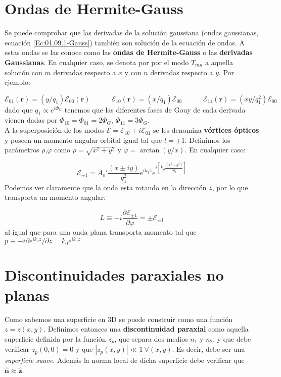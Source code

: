 \documentclass[12pt,a4paper]{book}
\numberwithin{equation}{section}
\numberwithin{figure}{section}
\newcommand{\tquad}{\quad \quad \quad}
\newcommand{\parentesis}[1]{\left( #1  \right)}
\newcommand{\parciales}[2]{\frac{\partial #1}{\partial #2}}
\newcommand{\ccorchetes}[1]{\left[ #1  \right]}
\newcommand{\1}{_{(1)}}
\newcommand{\2}{_{(2)}}
\newcommand{\zn}{\mathbf{z}}
\newcommand{\rn}{\mathbf{r}}
\newcommand{\nn}{\mathbf{n}}
\newcommand{\hnz}{\hat{\zn}}
\newcommand{\hnn}{\hat{\nn}}
\theoremstyle{definition}
\begin{document}
\section{Ondas de Hermite-Gauss}

Se puede comprobar que las derivadas de la solución gaussiana (ondas gaussianas, ecuación \ref{Ec:01.09.1-Gauss}) también son solución de la ecuación de ondas. A estas ondas se las conoce como las \textbf{ondas de Hermite-Gauss} o las \textbf{derivadas Gaussianas}. En cualquier caso, se denota por por el modo $T_{mn}$ a aquella solución con $m$ derivadas respecto a $x$ y con $n$ derivadas respecto a $y$. Por ejemplo:

\begin{equation}
\mathcal{E}_{01}  (\rn) =  (y/q_1) \mathcal{E}_{00} (\rn) \tquad \mathcal{E}_{10} (\rn) = (x/q_1) \mathcal{E}_{00} \tquad \mathcal{E}_{11} (\rn) = (xy/q_1^2) \mathcal{E}_{00}
\end{equation}
dado que $q_1 \propto e^{i \Phi_G}$ tenemos que las diferentes fases de Gouy de cada derivada vienen dadas por $\Phi_{10} = \Phi_{01} = 2 \Phi_G$, $\Phi_{11} = 3 \Phi_G $.  \\

A la superposición de los modos $\mathcal{E} = \mathcal{E}_{10} \pm i \mathcal{E}_{01}$ se les denomina \textbf{vórtices ópticos} y poseen un momento angular orbital igual tal que $l=\pm 1$. Definimos los parámetros $\rho$,$\varphi$ como $\rho = \sqrt{x^2 + y^2}$ y $\varphi = \arctan \parentesis{y/x}$. En cualquier caso:

\begin{equation}
\mathcal{E}_{\pm 1} = A_o ' \frac{(x \pm i y)}{q_1^2} e^{i k_1 z} e^{i \ccorchetes{k_o \frac{(x^2 + y^2)}{2 q_1}}}
\end{equation}
Podemos ver claramente que la onda esta rotando en la dirección $z$, por lo que transporta un momento angular:

\begin{equation}
L \equiv - i \parciales{\mathcal{E}_{\pm 1}}{\varphi} = \pm \mathcal{E}_{\pm 1} 
\end{equation}
al igual que para una onda plana transporta momento tal que $p \equiv - i \partial e^{i k_0 z} / \partial z = k_0 e^{i k_0 z}$

\section{Discontinuidades paraxiales no planas}

Como sabemos una superficie en 3D se puede construir como una función $z=z(x,y)$. Definimos entonces una \textbf{discontinuidad paraxial} como aquella superficie definida por la función $z_p$, que separa dos medios $n_1$ y $n_2$, y que debe verificar $z_p (0,0) = 0$ y que $|z_p (x,y) |\ll 1 \ \forall (x,y)$. Es decir, debe ser una \textit{superficie suave}. Además la norma local de dicha superficie debe verificar que $\hnn \approx \hnz$. \\
\end{document}
